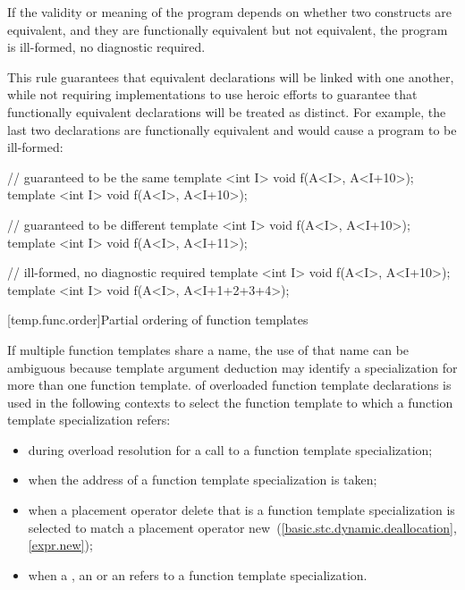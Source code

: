 \pnum
If the validity or meaning of the program depends on
whether two constructs are equivalent, and they are
functionally equivalent but not equivalent, the program is ill-formed,
no diagnostic required.

\pnum
\begin{note}
This rule guarantees that equivalent declarations will be linked with
one another, while not requiring implementations to use heroic efforts
to guarantee that functionally equivalent declarations will be treated
as distinct.
For example, the last two declarations are functionally
equivalent and would cause a program to be ill-formed:
\begin{codeblock}
// guaranteed to be the same
template <int I> void f(A<I>, A<I+10>);
template <int I> void f(A<I>, A<I+10>);

// guaranteed to be different
template <int I> void f(A<I>, A<I+10>);
template <int I> void f(A<I>, A<I+11>);

// ill-formed, no diagnostic required
template <int I> void f(A<I>, A<I+10>);
template <int I> void f(A<I>, A<I+1+2+3+4>);
\end{codeblock}
\end{note}

[temp.func.order]{Partial ordering of function templates}

\pnum
{}%
%
If multiple function templates share a name,
the use of that name can be ambiguous because
template argument deduction may identify
a specialization for more than one function template.
of overloaded function template declarations is used in the following contexts
to select the function template to which a function template specialization
refers:
\begin{itemize}
\item
during overload resolution for a call to a function template specialization;
\item
when the address of a function template specialization is taken;
\item
when a placement operator delete that is a
function template
specialization
is selected to match a placement operator new~(\ref{basic.stc.dynamic.deallocation}, \ref{expr.new});
\item
when a , an
 or an  refers to
a function template specialization.
\end{itemize}

